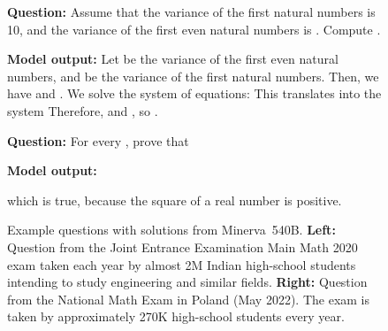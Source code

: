 \documentclass{article}
\newcommand{\ourmodel}[0]{{Minerva~}}
\begin{document}
\setlength{\columnsep}{1cm}
\begin{figure}[t]
\begin{multicols}{2}

\begin{tcolorbox}[colback=blue!5!white,colframe=blue!75!black]
\begin{small}
\textbf{Question:}
Assume that the variance of the first  natural numbers is 10, and the variance of the first  even natural numbers is . Compute .
\end{small}

\vspace{2.8mm}
\tcblower
\vspace{-0.5mm}

\begin{small}
\textbf{Model output:}
Let  be the variance of the first  even natural numbers, and  be the variance of the first  natural numbers. Then, we have  and . We solve the system of equations:  This translates into the system  Therefore,  and , so .
\vspace{2.8mm}
\end{small}
\end{tcolorbox}

\vspace{2mm}

\begin{tcolorbox}[colback=blue!5!white,colframe=blue!75!black]
\begin{small}
\textbf{Question:}
For every ,  prove that

\end{small}

\vspace{-0.5mm}
\tcblower
\vspace{-0.5mm}

\begin{small}
\textbf{Model output:}



which is true, because the square of a real number is positive.

\vspace{2.6mm}

\end{small}
\end{tcolorbox}

\end{multicols}

\caption{\small
Example questions with solutions from \ourmodel 540B.  
\textbf{Left:}  Question from the Joint Entrance Examination Main Math 2020 exam taken each year by almost 2M Indian high-school students intending to study engineering and similar fields.
\textbf{Right:} Question from the National Math Exam in Poland (May 2022). The exam is taken by approximately 270K high-school students every year.
}
\label{fig:examples}
\end{figure}
\end{document}

